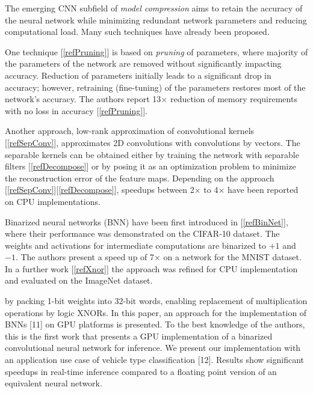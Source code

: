 \documentclass[conference,compsoc]{IEEEtran}
\newcommand{\jani}[1]{\textcolor{red}{\textbf{[Jani: #1]}}}
\newcommand{\response}[1]{\textcolor{darkgreen}{#1}}
\begin{document}
The emerging CNN subfield of \textit{model compression} aims to retain the accuracy of the neural network while minimizing redundant network parameters and reducing computational load. Many such techniques have already been proposed.


One technique [\ref{refPruning}] is based on \textit{pruning} of parameters, where majority of the parameters of the network are removed without significantly impacting accuracy. Reduction of parameters initially leads to a significant drop in accuracy; however, retraining (fine-tuning) of the parameters restores most of the network's accuracy. The authors report 13$\times$ reduction of memory requirements with no loss in accuracy [\ref{refPruning}].

Another approach, low-rank approximation of convolutional kernels [\ref{refSepConv}], approximates 2D convolutions with convolutions by vectors. The separable kernels can be obtained either by training the network with separable filters [\ref{refDecompose}] or by posing it as an optimization problem to minimize the reconstruction error of the feature maps. Depending on the approach [\ref{refSepConv}][\ref{refDecompose}], speedups between 2$\times$ to 4$\times$ have been reported on CPU implementations.


Binarized neural networks (BNN) have been first introduced in [\ref{refBinNet}], where their performance was demonstrated on the CIFAR-10 dataset. The weights and activations for intermediate computations are binarized to $+1$ and $-1$. The authors present a speed up of 7$\times$ on a network for the MNIST dataset. In a further work [\ref{refXnor}] the approach was refined for CPU implementation and evaluated on the ImageNet dataset.

by packing 1-bit weights into 32-bit words, enabling replacement of multiplication operations by logic XNORs.
In this paper, an approach for the implementation of
BNNs [11] on GPU platforms is presented. To the best
knowledge of the authors, this is the first work that presents
a GPU implementation of a binarized convolutional neural
network for inference. We present our implementation with
an application use case of vehicle type classification [12].
Results show significant speedups in real-time inference
compared to a floating point version of an equivalent neural
network.
\end{document}
